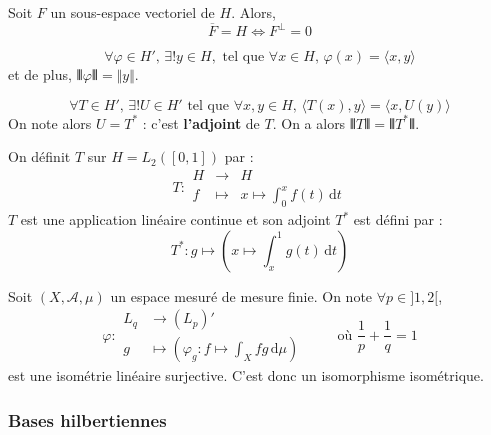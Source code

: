   \begin{corollary}
    Soit $F$ un sous-espace vectoriel de $H$. Alors,
    \[ \overline{F} = H \iff F^\perp = 0 \]
  \end{corollary}

  \begin{theorem}
    \[ \forall \varphi \in H', \, \exists! y \in H, \text{ tel que } \forall x \in H, \, \varphi(x) = \langle x, y \rangle \]
    et de plus, $\VERT \varphi \VERT = \Vert y \Vert$.
  \end{theorem}

  \begin{corollary}
    \[ \forall T \in H', \, \exists! U \in H' \text{ tel que } \forall x, y \in H, \, \langle T(x), y \rangle = \langle x, U(y) \rangle \]
    On note alors $U = T^*$ : c'est \textbf{l'adjoint} de $T$. On a alors $\VERT T \VERT = \VERT T^* \VERT$.
  \end{corollary}


  \begin{example}
    On définit $T$ sur $H = L_2([0,1])$ par :
    \[
    T : \begin{array}{ccc}
      H &\rightarrow& H \\
      f &\mapsto& x \mapsto \int_{0}^{x} f(t) \, \mathrm{d}t
    \end{array}
    \]
    $T$ est une application linéaire continue et son adjoint $T^*$ est défini par :
    \[ T^* : g \mapsto \left(x \mapsto \int_x^1 g(t) \, \mathrm{d}t \right) \]
  \end{example}


  \begin{application}[Dual de $L_p$]
    Soit $(X, \mathcal{A}, \mu)$ un espace mesuré de mesure finie. On note $\forall p \in ]1,2[$,
    \[
    \varphi :
    \begin{array}{ll}
      L_q &\rightarrow (L_p)' \\
      g &\mapsto \left( \varphi_g : f \mapsto \int_X f g \, \mathrm{d}\mu \right)
    \end{array}
    \qquad \text{ où } \frac{1}{p} + \frac{1}{q} = 1
    \]
    est une isométrie linéaire surjective. C'est donc un isomorphisme isométrique.
  \end{application}

  \subsubsection{Bases hilbertiennes}

